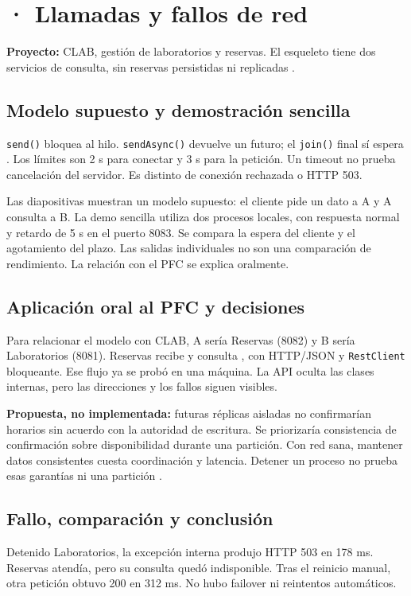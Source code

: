 \section*{\personaCuatro{} · Llamadas y fallos de red}
\small
\textbf{Proyecto:} CLAB, gestión de laboratorios y reservas. El esqueleto tiene dos servicios de consulta, sin reservas persistidas ni replicadas \cite{clabEsqueleto2026}.

\subsection*{Modelo supuesto y demostración sencilla}
\texttt{send()} bloquea al hilo. \texttt{sendAsync()} devuelve un futuro; el \texttt{join()} final sí espera \cite{java17httpclient}. Los límites son 2 s para conectar y 3 s para la petición. Un timeout no prueba cancelación del servidor. Es distinto de conexión rechazada o HTTP 503.

Las diapositivas muestran un modelo supuesto: el cliente pide un dato a A y A consulta a B. La demo sencilla utiliza dos procesos locales, con respuesta normal y retardo de 5 s en el puerto 8083. Se compara la espera del cliente y el agotamiento del plazo. Las salidas individuales no son una comparación de rendimiento. La relación con el PFC se explica oralmente.

\subsection*{Aplicación oral al PFC y decisiones}
Para relacionar el modelo con CLAB, A sería Reservas (8082) y B sería Laboratorios (8081). Reservas recibe  y consulta , con HTTP/JSON y \texttt{RestClient} bloqueante. Ese flujo ya se probó en una máquina. La API oculta las clases internas, pero las direcciones y los fallos siguen visibles.

\textbf{Propuesta, no implementada:} futuras réplicas aisladas no confirmarían horarios sin acuerdo con la autoridad de escritura. Se priorizaría consistencia de confirmación sobre disponibilidad durante una partición. Con red sana, mantener datos consistentes cuesta coordinación y latencia. Detener un proceso no prueba esas garantías ni una partición \cite{ahmed2023consistency}.

\subsection*{Fallo, comparación y conclusión}
Detenido Laboratorios, la excepción interna produjo HTTP 503 en 178 ms. Reservas atendía, pero su consulta quedó indisponible. Tras el reinicio manual, otra petición obtuvo 200 en 312 ms. No hubo failover ni reintentos automáticos.

